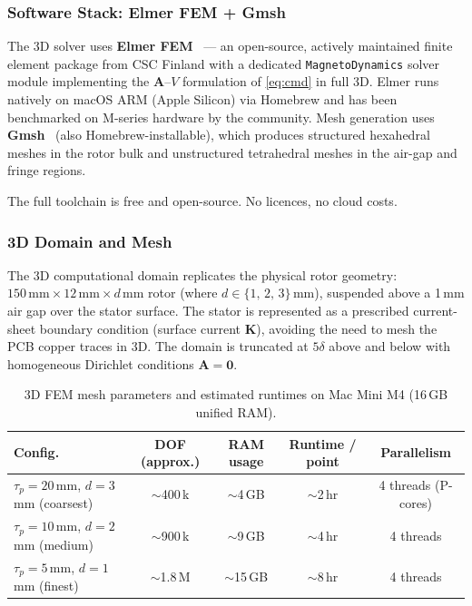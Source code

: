 \documentclass[12pt,letterpaper]{article}
\begin{document}
\subsubsection{Software Stack: Elmer FEM + Gmsh}

The 3D solver uses \textbf{Elmer FEM}~\cite{ElmerTeam2020} — an open-source,
actively maintained finite element package from CSC Finland with a dedicated
\texttt{MagnetoDynamics} solver module implementing the $\mathbf{A}$--$V$ formulation
of \cref{eq:cmd} in full 3D. Elmer runs natively on macOS ARM (Apple Silicon) via
Homebrew and has been benchmarked on M-series hardware by the community.
Mesh generation uses \textbf{Gmsh}~\cite{Geuzaine2009} (also Homebrew-installable),
which produces structured hexahedral meshes in the rotor bulk and unstructured
tetrahedral meshes in the air-gap and fringe regions.

The full toolchain is free and open-source. No licences, no cloud costs.

\subsubsection{3D Domain and Mesh}

The 3D computational domain replicates the physical rotor geometry:
$150\,\mathrm{mm} \times 12\,\mathrm{mm} \times d\,\mathrm{mm}$ rotor (where
$d \in \{1,\,2,\,3\}$\,mm), suspended above a 1\,mm air gap over the stator surface.
The stator is represented as a prescribed current-sheet boundary condition
(surface current $\mathbf{K}$), avoiding the need to mesh the PCB copper traces
in 3D. The domain is truncated at $5\delta$ above and below with homogeneous
Dirichlet conditions $\mathbf{A} = \mathbf{0}$.

\begin{table}[H]
\centering
\caption{3D FEM mesh parameters and estimated runtimes on Mac Mini M4 (16\,GB unified RAM).}
\label{tab:mesh3d}
\begin{tabular}{lcccc}
\toprule
\textbf{Config.} & \textbf{DOF (approx.)} & \textbf{RAM usage} & \textbf{Runtime / point} & \textbf{Parallelism} \\
\midrule
$\tau_p = 20$\,mm, $d = 3$\,mm (coarsest) & $\sim$400\,k & $\sim$4\,GB & $\sim$2\,hr & 4 threads (P-cores) \\
$\tau_p = 10$\,mm, $d = 2$\,mm (medium)   & $\sim$900\,k & $\sim$9\,GB & $\sim$4\,hr & 4 threads \\
$\tau_p = 5$\,mm, $d = 1$\,mm (finest)    & $\sim$1.8\,M & $\sim$15\,GB & $\sim$8\,hr & 4 threads \\
\bottomrule
\end{tabular}
\end{table}
\end{document}
